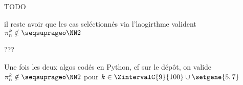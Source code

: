 \leavevmode
\smallskip

TODO

il reste avoir que les cas seléctionnés via l'laogirthme valident $\consprod \notin \NNsquare$


???

Une fois les deux algos codés en Python, cf sur le dépôt, on valide $\consprod \notin \NNsquare$ pour $k \in \ZintervalC{9}{100} \cup \setgene{5, 7}$ 
